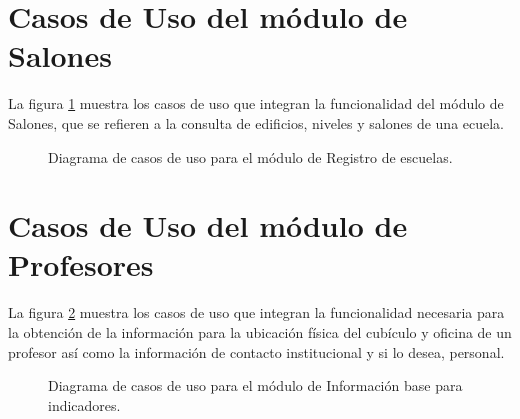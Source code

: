 \section{Casos de Uso del módulo de Salones}

    La figura \ref{fig:casosUso:registro} muestra los casos de uso que integran la funcionalidad del módulo de Salones, que se refieren a la consulta de edificios, niveles y salones de una ecuela.

    \begin{figure}[h!]
	\begin{center}
	\caption{Diagrama de casos de uso para el módulo de Registro de escuelas. \label{fig:casosUso:registro}}
	\end{center}
    \end{figure}

\section{Casos de Uso del módulo de Profesores}
La figura \ref{fig:casosUso:comite} muestra los casos de uso que integran la funcionalidad necesaria para la obtención de la información para la ubicación física del cubículo y oficina de un profesor así como la información de contacto institucional y si lo desea, personal.

 \begin{figure}[h!]
     \begin{center}
     \caption{Diagrama de casos de uso para el módulo de Información base para indicadores.}
     \label{fig:casosUso:comite}
     \end{center}
 \end{figure}

